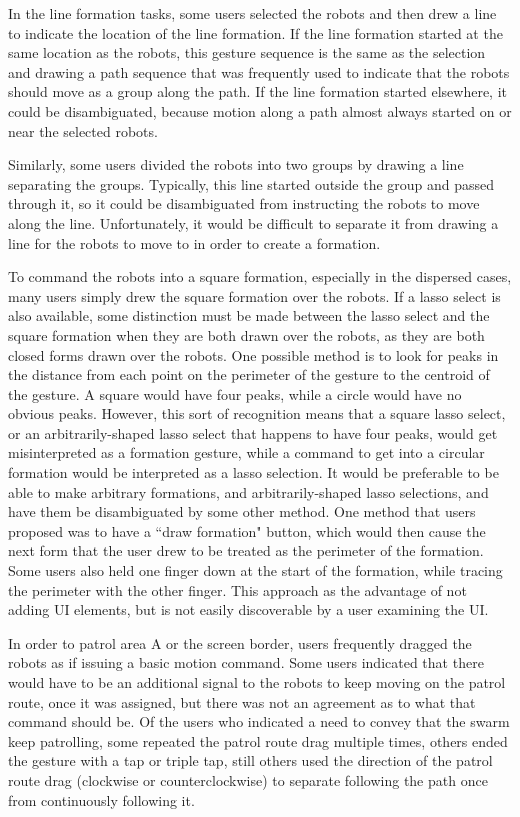 In the line formation tasks, some users selected the robots and then drew a line to indicate the location of the line formation.
If the line formation started at the same location as the robots, this gesture sequence is the same as the selection and drawing a path sequence that was frequently used to indicate that the robots should move as a group along the path. 
If the line formation started elsewhere, it could be disambiguated, because motion along a path almost always started on or near the selected robots.  

Similarly, some users divided the robots into two groups by drawing a line separating the groups.
Typically, this line started outside the group and passed through it, so it could be disambiguated from instructing the robots to move along the line.
Unfortunately, it would be difficult to separate it from drawing a line for the robots to move to in order to create a formation.

To command the robots into a square formation, especially in the dispersed cases, many users simply drew the square formation over the robots.
If a lasso select is also available, some distinction must be made between the lasso select and the square formation when they are both drawn over the robots, as they are both closed forms drawn over the robots.
One possible method is to look for peaks in the distance from each point on the perimeter of the gesture to the centroid of the gesture. 
A square would have four peaks, while a circle would have no obvious peaks. 
However, this sort of recognition means that a square lasso select, or an arbitrarily-shaped lasso select that happens to have four peaks, would get misinterpreted as a formation gesture, while a command to get into a circular formation would be interpreted as a lasso selection. 
It would be preferable to be able to make arbitrary formations, and arbitrarily-shaped lasso selections, and have them be disambiguated by some other method. 
One method that users proposed was to have a ``draw formation" button, which would then cause the next form that the user drew to be treated as the perimeter of the formation. 
Some users also held one finger down at the start of the formation, while tracing the perimeter with the other finger. 
This approach as the advantage of not adding UI elements, but is not easily discoverable by a user examining the UI. 

In order to patrol area A or the screen border, users frequently dragged the robots as if issuing a basic motion command. 
Some users indicated that there would have to be an additional signal to the robots to keep moving on the patrol route, once it was assigned, but there was not an agreement as to what that command should be. 
Of the users who indicated a need to convey that the swarm keep patrolling, some repeated the patrol route drag multiple times, others ended the gesture with a tap or triple tap, still others used the direction of the patrol route drag (clockwise or counterclockwise) to separate following the path once from continuously following it. 

